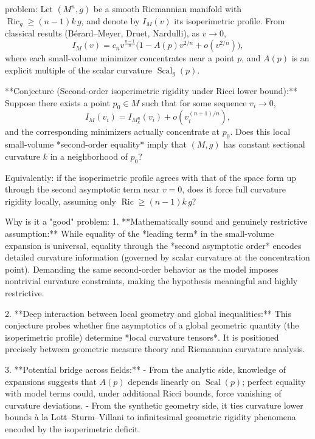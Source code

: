 problem:  
Let \((M^n,g)\) be a smooth Riemannian manifold with \(\operatorname{Ric}_g \ge (n-1)k\,g\), and denote by \(I_M(v)\) its isoperimetric profile.  
From classical results (Bérard–Meyer, Druet, Nardulli), as \(v\to 0\),
\[
I_M(v) = c_n v^{\frac{n-1}{n}} \Big(1 - A(p) v^{2/n} + o(v^{2/n})\Big),
\]
where each small-volume minimizer concentrates near a point \(p\), and \(A(p)\) is an explicit multiple of the scalar curvature \(\operatorname{Scal}_g(p)\).  

**Conjecture (Second-order isoperimetric rigidity under Ricci lower bound):**  
Suppose there exists a point \(p_0\in M\) such that for some sequence \(v_i\to 0\),  
\[
I_M(v_i) = I_{M_k^n}(v_i) + o(v_i^{(n+1)/n}),
\]
and the corresponding minimizers actually concentrate at \(p_0\).  
Does this local small-volume *second-order equality* imply that \((M,g)\) has constant sectional curvature \(k\) in a neighborhood of \(p_0\)?

Equivalently: if the isoperimetric profile agrees with that of the space form up through the second asymptotic term near \(v=0\), does it force full curvature rigidity locally, assuming only \(\operatorname{Ric}\ge (n-1)k\,g\)?

Why is it a "good" problem:  
1. **Mathematically sound and genuinely restrictive assumption:**  
   While equality of the *leading term* in the small-volume expansion is universal, equality through the *second asymptotic order* encodes detailed curvature information (governed by scalar curvature at the concentration point). Demanding the same second-order behavior as the model imposes nontrivial curvature constraints, making the hypothesis meaningful and highly restrictive.

2. **Deep interaction between local geometry and global inequalities:**  
   This conjecture probes whether fine asymptotics of a global geometric quantity (the isoperimetric profile) determine *local curvature tensors*. It is positioned precisely between geometric measure theory and Riemannian curvature analysis.

3. **Potential bridge across fields:**  
   - From the analytic side, knowledge of expansions suggests that \(A(p)\) depends linearly on \(\operatorname{Scal}(p)\); perfect equality with model terms could, under additional Ricci bounds, force vanishing of curvature deviations.  
   - From the synthetic geometry side, it ties curvature lower bounds à la Lott–Sturm–Villani to infinitesimal geometric rigidity phenomena encoded by the isoperimetric deficit.


